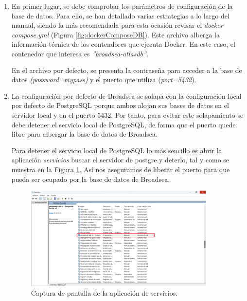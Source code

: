 \documentclass{article}
\begin{document}
\begin{enumerate}

    \item En primer lugar, se debe comprobar los parámetros de configuración de la base de datos. Para ello, se han detallado varias estrategias a lo largo del manual, siendo la más recomendada para esta ocasión revisar el \textit{docker-compose.yml} (Figura \ref{fig:dockerComposeDB}). Este archivo alberga la información técnica de los contendores que ejecuta Docker. En este caso, el contenedor que interesa es \textit{''broadsea-atlasdb''}.

    En el archivo por defecto, se presenta la contraseña para acceder a la base de datos \textit{(password=mypass)} y el puerto que utiliza (\textit{port=5432}).

    \item La configuración por defecto de Broadsea se solapa con la configuración local por defecto de PostgreSQL porque ambos alojan sus bases de datos en el servidor local y en el puerto 5432. Por tanto, para evitar este solapamiento se debe detener el servicio local de PostgreSQL, de forma que el puerto quede libre para albergar la base de datos de Broadsea.

    Para detener el servicio local de PostgreSQL lo más sencillo es abrir la aplicación \textit{servicios} buscar el servidor de postgre y deterlo, tal y como se muestra en la Figura \ref{fig:serviciosConfig}. Así nos aseguramos de liberar el puerto para que pueda ser ocupado por la base de datos de Broadsea.

    \begin{figure}[H]
    \centering
    \includegraphics[width=0.90\textwidth]{images/serviciosConfig.png}
     \caption{Captura de pantalla de la aplicación de servicios.}
    \label{fig:serviciosConfig}
    \end{figure}


\end{enumerate}
\end{document}

